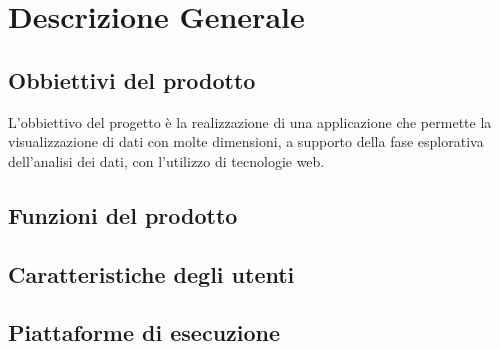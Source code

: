 \section{Descrizione Generale}
\subsection{Obbiettivi del prodotto}
L'obbiettivo del progetto è la realizzazione di una applicazione che permette la visualizzazione di dati con molte dimensioni, a supporto della fase esplorativa dell'analisi dei dati, con l'utilizzo di tecnologie web.
\subsection{Funzioni del prodotto}

\subsection{Caratteristiche degli utenti}

\subsection{Piattaforme di esecuzione}

